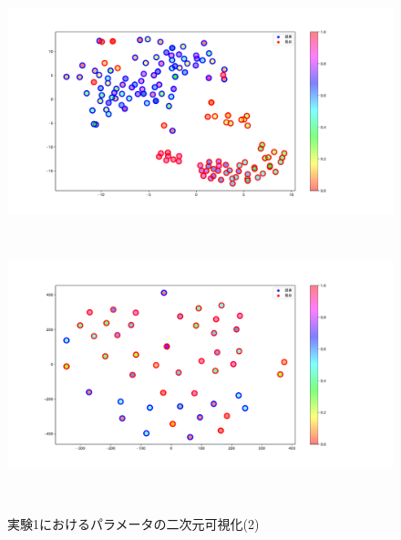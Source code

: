 \begin{figure}[h]
\begin{minipage}[b]{0.48\linewidth}
 \end{minipage}
 \begin{minipage}[b]{0.48\linewidth}
  \centering
  \includegraphics[scale=0.15]{./imgs/tSNE/cake_10.pdf}
 \end{minipage}\\
 \begin{minipage}[b]{0.48\linewidth}
  \centering
  \includegraphics[scale=0.15]{./imgs/tSNE/cake_11.pdf}
 \end{minipage}\\
 \caption{実験1におけるパラメータの二次元可視化(2)}\label{fig:tSNE1_2}
\end{figure}



